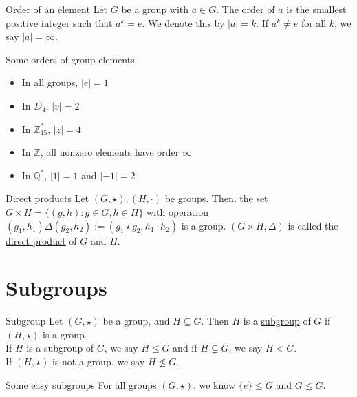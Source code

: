 \documentclass[12pt]{article}
\newcommand{\Z}{\mathbb{Z}}
\newcommand{\Q}{\mathbb{Q}}
\begin{document}
	\begin{mydef}{Order of an element}{}
		Let $G$ be a group with $a\in G$. The \underline{order} of $a$ is the smallest positive integer such that $a^k=e$. We denote this by $|a|=k$. If $a^k\neq e$ for all $k$, we say $|a|=\infty$.
	\end{mydef}
	
	\begin{myex}{Some orders of group elements}{}
		\begin{itemize}
			\item In all groups, $|e|=1$\\
			\item In $D_4$, $|v|=2$\\
			\item In $\Z_{15}^*$, $|z|=4$\\
			\item In $\Z$, all nonzero elements have order $\infty$\\
			\item In $\Q^*$, $|1|=1$ and $|-1|=2$
		\end{itemize}			
	\end{myex}
	
	\begin{mydef}{Direct products}{}
		Let $(G, \star), (H, \cdot)$ be groups. Then, the set $G\times H=\{(g, h):g\in G, h\in H\}$ with operation $(g_1, h_1)\Delta(g_2, h_2):=(g_1\star g_2, h_1\cdot h_2)$ is a group. $(G\times H, \Delta)$ is called the \underline{direct product} of $G$ and $H$.
	\end{mydef}
	
	\section{Subgroups}
	\begin{mydef}{Subgroup}{}
		Let $(G, \star)$ be a group, and $H\subseteq G$. Then $H$ is a \underline{subgroup} of $G$ if $(H, \star)$ is a group.\\
		
		If $H$ is a subgroup of $G$, we say $H\leq G$ and if $H\subsetneq G$, we say $H<G$.\\
		
		If 	$(H, \star)$ is not a group, we say $H\nleq G$.
	\end{mydef}
	
	\begin{myex}{Some easy subgroups}{}
		For all groups $(G, \star)$, we know $\{e\}\leq G$ and $G\leq G$.
	\end{myex}
	
\end{document}
